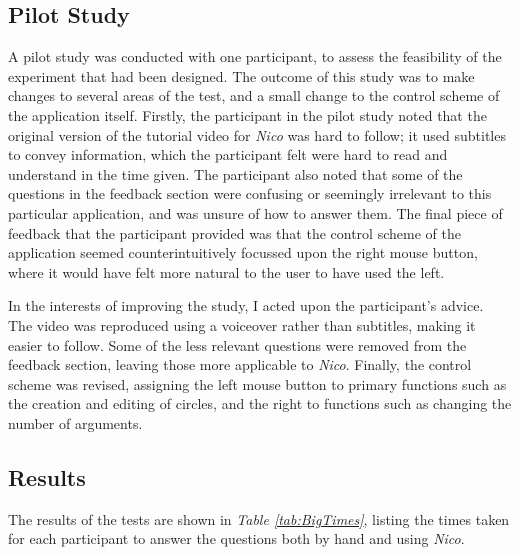 \documentclass[12pt,twoside,notitlepage,xetex]{report}
\begin{document}
\subsection{Pilot Study}

A pilot study was conducted with one participant, to assess the feasibility of
the experiment that had been designed.  The outcome of this study was to make
changes to several areas of the test, and a small change to the control scheme
of the application itself.  Firstly, the participant in the pilot study noted that the
original version of the tutorial video for \emph{Nico} was hard to follow; it
used subtitles to convey information, which the participant felt were hard to
read and understand in the time given.  The participant also noted that some of the
questions in the feedback section were confusing or seemingly irrelevant to
this particular application, and was unsure of how to answer them.  The final
piece of feedback that the participant provided was that the control scheme of the
application seemed counterintuitively focussed upon the right mouse button,
where it would have felt more natural to the user to have used the left.

In the interests of improving the study, I acted upon the participant's advice.
The video was reproduced using a voiceover rather than subtitles, making it
easier to follow.  Some of the less relevant questions were removed from the
feedback section, leaving those more applicable to \emph{Nico}.  Finally, the
control scheme was revised, assigning the left mouse button to primary
functions such as the creation and editing of circles, and the right to
functions such as changing the number of arguments.

\subsection{Results}

The results of the tests are shown in \emph{Table \ref{tab:BigTimes}}, listing the times taken
for each participant to answer the questions both by hand and using \emph{Nico}.
\end{document}
